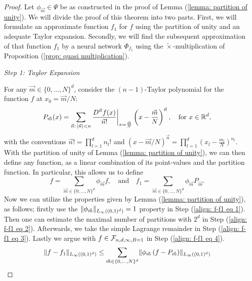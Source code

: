 \begin{proof}
    Let $\phi_{\vec{m}} \in \Psi$ be as constructed in the 
    proof of Lemma (\ref{lemma: partition of unity}). We will divide the proof of this theorem into
    two parts.
    First, we will formulate an approximate function $f_1$ for $f$ using the partition of unity and
    an adequate Taylor expansion. Secondly, we will find
    the subsequent approximation of that function $f_1$ by a neural network $\Phi_{f_1}$
    using the $\tilde{\times}$-multiplication of Proposition (\ref{prop: quasi multiplication}).

    \vspace{0.5cm}
    \noindent\textit{Step 1: Taylor Expansion}
    
    For any $\vec{m} \in \{0, \dots, N\}^d$, consider the $(n-1)$-Taylor polynomial for the function $f$ at
    $x_0 = \vec{m}/N$:
    \begin{equation*}
        P_{\vec{m}}(x) = \sum_{\vec{n}: \, \vert \vec{n} \vert < n} \frac{D^{\vec{n}} f(x)}{\vec{n}!} 
        \bigg\vert_{x = \frac{\vec{m}}{N}} \left( x - \frac{\vec{m}}{N} \right)^{\vec{n}},
        \quad \text{for } x \in \mathbb{R}^d,
    \end{equation*}
    with the conventions $\vec{n}! = \prod_{l=1}^d n_l!$ and $(x - \vec{m}/N)^{\vec{n}} = \prod_{l=1}^d(x_l - \frac{m_l}{N})^{n_l}$.
    With the partition of unity of Lemma (\ref{lemma: partition of unity}), we can then define any function,
    as a linear combination of its point-values and the partition function. In particular, this allows us
    to define
    \begin{equation*}
        f = \sum_{\vec{m} \in \{0, \dots, N\}^d} \phi_{\vec{m}} f, \quad \text{and} \quad f_1 = \sum_{\vec{m} \in \{0, \dots, N\}^d} \phi_{\vec{m}} P_{\vec{m}}.
    \end{equation*}
    Now we can utilize the properties given by Lemma (\ref{lemma: partition of unity}), as follows;
    firstly use the $\lVert \phi_{\vec{m}} \rVert_{L_\infty((0,1)^d)} = 1$ property in Step (\ref{align: f-f1 eq 1}). Then one can estimate the 
    maximal number of partitions with $2^d$ in Step (\ref{align: f-f1 eq 2}). Afterwards, we take the
    simple Lagrange remainder in Step (\ref{align: f-f1 eq 3}).
    Lastly we argue with $f \in \mathcal{F}_{n, d, \infty, B=1}$ in Step (\ref{align: f-f1 eq 4}).
    \begin{align}
        \inftynorm{f - f_1} &\leq \sum_{\vec{m} \in \{0, \dots, N\}^d} 
        \inftynorm{\phi_{\vec{m}} \left( f - P_{\vec{m}} \right)} \\

\end{align}
\end{proof}
